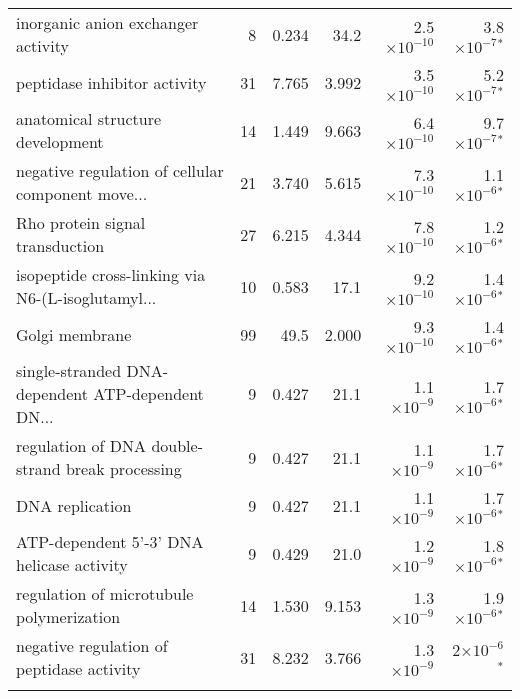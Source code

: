 \begin{longtable}{|l|r|r|r|r|r|}
                inorganic anion exchanger activity &                       8 &                   0.234 &       34.2 & 2.5$\times 10^{-10}$ &   3.8$\times 10^{-7}$$\bm{^*}$ \\
                      peptidase inhibitor activity &                      31 &                   7.765 &      3.992 & 3.5$\times 10^{-10}$ &   5.2$\times 10^{-7}$$\bm{^*}$ \\
                  anatomical structure development &                      14 &                   1.449 &      9.663 & 6.4$\times 10^{-10}$ &   9.7$\times 10^{-7}$$\bm{^*}$ \\
 negative regulation of cellular component move... &                      21 &                   3.740 &      5.615 & 7.3$\times 10^{-10}$ &   1.1$\times 10^{-6}$$\bm{^*}$ \\
                   Rho protein signal transduction &                      27 &                   6.215 &      4.344 & 7.8$\times 10^{-10}$ &   1.2$\times 10^{-6}$$\bm{^*}$ \\
 isopeptide cross-linking via N6-(L-isoglutamyl... &                      10 &                   0.583 &       17.1 & 9.2$\times 10^{-10}$ &   1.4$\times 10^{-6}$$\bm{^*}$ \\
                                    Golgi membrane &                      99 &                    49.5 &      2.000 & 9.3$\times 10^{-10}$ &   1.4$\times 10^{-6}$$\bm{^*}$ \\
 single-stranded DNA-dependent ATP-dependent DN... &                       9 &                   0.427 &       21.1 &  1.1$\times 10^{-9}$ &   1.7$\times 10^{-6}$$\bm{^*}$ \\
  regulation of DNA double-strand break processing &                       9 &                   0.427 &       21.1 &  1.1$\times 10^{-9}$ &   1.7$\times 10^{-6}$$\bm{^*}$ \\
                                   DNA replication &                       9 &                   0.427 &       21.1 &  1.1$\times 10^{-9}$ &   1.7$\times 10^{-6}$$\bm{^*}$ \\
         ATP-dependent 5'-3' DNA helicase activity &                       9 &                   0.429 &       21.0 &  1.2$\times 10^{-9}$ &   1.8$\times 10^{-6}$$\bm{^*}$ \\
          regulation of microtubule polymerization &                      14 &                   1.530 &      9.153 &  1.3$\times 10^{-9}$ &   1.9$\times 10^{-6}$$\bm{^*}$ \\
         negative regulation of peptidase activity &                      31 &                   8.232 &      3.766 &  1.3$\times 10^{-9}$ &     2$\times 10^{-6}$$\bm{^*}$ \\
$$
\end{longtable}
